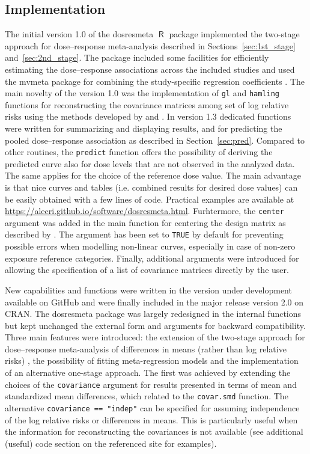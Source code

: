 \documentclass[11pt,a4paper,twoside,openany]{book}\usepackage{knitr}
\newcommand{\pkg}[1]{{\fontseries{b}\selectfont #1}}
\DeclareMathOperator{\R}{\textsf{R}}
\begin{document}
{\subsection{Implementation}

The initial version 1.0 of the \pkg{dosresmeta} $\R$ package implemented the two-stage approach for dose--response meta-analysis described in Sections~\ref{sec:1st_stage} and~\ref{sec:2nd_stage}. The package included some facilities for efficiently estimating the dose--response associations across the included studies and used the \pkg{mvmeta} package for combining the study-specific regression coefficients \citep{gasparrini2012multivariate}. The main novelty of the version 1.0 was the implementation of \texttt{gl} and \texttt{hamling} functions for reconstructing the covariance matrices among set of log relative risks using the methods developed by \cite{greenland1992methods} and \cite{hamling2008facilitating}. 
In version 1.3 dedicated functions were written for summarizing and displaying results, and for predicting the pooled dose--response association as described in Section~\ref{sec:pred}. Compared to other routines, the \texttt{predict} function offers the possibility of deriving the predicted curve also for dose levels that are not observed in the analyzed data. The same applies for the choice of the reference dose value. The main advantage is that nice curves and tables (i.e. combined results for desired dose values) can be easily obtained with a few lines of code. Practical examples are available at \url{https://alecri.github.io/software/dosresmeta.html}.
Furhtermore, the \texttt{center} argument was added in the main function for centering the design matrix as described by \cite{liu2009two}. The argument has been set to \texttt{TRUE} by default for preventing possible errors when modelling non-linear curves, especially in case of non-zero exposure reference categories. Finally, additional arguments were introduced for allowing the specification of a list of covariance matrices directly by the user.

\noindent New capabilities and functions were written in the version under development available on GitHub and were finally included in the major release version 2.0 on CRAN. The \pkg{dosresmeta} package was largely redesigned in the internal functions but kept unchanged the external form and arguments for backward compatibility. Three main features were introduced: the extension of the two-stage approach for dose--response meta-analysis of differences in means (rather than log relative risks) \citep{crippa2016dose}, the  possibility of fitting meta-regression models and the implementation of an alternative one-stage approach. The first was achieved by extending the choices of the \texttt{covariance} argument for results presented in terms of mean and standardized mean differences, which related to the \texttt{covar.smd} function. The alternative \texttt{covariance == "indep"} can be specified for assuming independence of the log relative risks or differences in means. This is particularly useful when the information for reconstructing the covariances is not available (see additional (useful) code section on the referenced site for examples).

}
\end{document}
